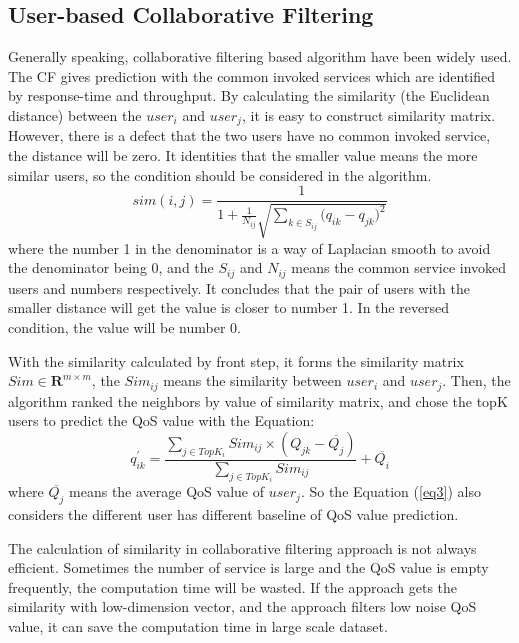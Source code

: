 \documentclass[conference]{IEEEtran}
\begin{document}
\subsection{User-based Collaborative Filtering}
Generally speaking, collaborative filtering based algorithm have been widely used. The CF gives prediction with the common invoked services which are identified by response-time and throughput. By calculating the similarity (the Euclidean distance) between the $user_i$ and $user_j$, it is easy to construct similarity matrix. However, there is a defect that the two users have no common invoked service, the distance will be zero. It identities that the smaller value means the more similar users, so the condition should be considered in the algorithm. 
\begin{equation}
sim(i,j)=\frac{1}{
  1+\frac{1}{N_{ij}}\sqrt{\sum_{k \in S_{ij}}{(q_{ik}-q_{jk}})^{2}}
}  \label{eq2}
\end{equation}
where the number 1 in the denominator is a way of Laplacian smooth to avoid the denominator being 0, and the $S_{ij}$ and $N_{ij}$ means the common service invoked users and numbers respectively. It concludes that the pair of users with the smaller distance will get the value is closer to number 1. In the reversed condition, the value will be number 0.
\par With the similarity calculated by front step, it forms the similarity matrix $Sim \in \textbf{R}^{m\times m}$, the $Sim_{ij}$ means the similarity between $user_{i}$ and $user_{j}$. Then, the algorithm ranked the neighbors by value of similarity matrix, and chose the topK users to predict the QoS value with the Equation:
\begin{equation}
q^{'}_{ik}=\frac{
  \sum_{j \in TopK_{i}}{Sim_{ij} \times (Q_{jk}-\overline{Q_{j}})}
  }{
  \sum_{j \in TopK_{i}}{Sim_{ij}}
}+\overline{Q_{i}} 
\label{eq3}
\end{equation}
where $\overline{Q_{j}}$ means the average QoS value of $user_{j}$. So the Equation (\ref{eq3}) also considers the different user has different baseline of QoS value prediction. 
\par The calculation of similarity in collaborative filtering approach is not always efficient. Sometimes the number of service is large and the QoS value is empty frequently, the computation time will be wasted. If the approach gets the similarity with low-dimension vector, and the approach filters low noise QoS value, it can save the computation time in large scale dataset.
\end{document}
